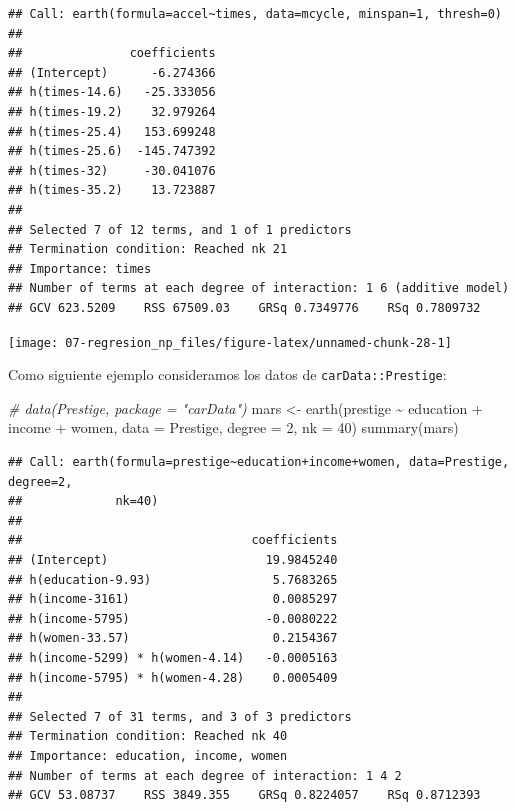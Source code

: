 \documentclass[
]{book}
\newenvironment{Shaded}{\begin{snugshade}}{\end{snugshade}}
\newcommand{\AttributeTok}[1]{\textcolor[rgb]{0.77,0.63,0.00}{#1}}
\newcommand{\CommentTok}[1]{\textcolor[rgb]{0.56,0.35,0.01}{\textit{#1}}}
\newcommand{\DecValTok}[1]{\textcolor[rgb]{0.00,0.00,0.81}{#1}}
\newcommand{\FunctionTok}[1]{\textcolor[rgb]{0.00,0.00,0.00}{#1}}
\newcommand{\NormalTok}[1]{#1}
\newcommand{\OtherTok}[1]{\textcolor[rgb]{0.56,0.35,0.01}{#1}}
\newcommand{\SpecialCharTok}[1]{\textcolor[rgb]{0.00,0.00,0.00}{#1}}
\newcommand{\StringTok}[1]{\textcolor[rgb]{0.31,0.60,0.02}{#1}}
\theoremstyle{break}
\theoremstyle{definition}
\theoremstyle{definition}
\theoremstyle{definition}
\theoremstyle{definition}
\theoremstyle{remark}
\begin{document}
\begin{verbatim}
## Call: earth(formula=accel~times, data=mcycle, minspan=1, thresh=0)
## 
##               coefficients
## (Intercept)      -6.274366
## h(times-14.6)   -25.333056
## h(times-19.2)    32.979264
## h(times-25.4)   153.699248
## h(times-25.6)  -145.747392
## h(times-32)     -30.041076
## h(times-35.2)    13.723887
## 
## Selected 7 of 12 terms, and 1 of 1 predictors
## Termination condition: Reached nk 21
## Importance: times
## Number of terms at each degree of interaction: 1 6 (additive model)
## GCV 623.5209    RSS 67509.03    GRSq 0.7349776    RSq 0.7809732
\end{verbatim}

\begin{Shaded}
\end{Shaded}

\begin{center}\texttt{[image: 07-regresion\_np\_files/figure-latex/unnamed-chunk-28-1]} \end{center}

Como siguiente ejemplo consideramos los datos de \texttt{carData::Prestige}:

\begin{Shaded}
\begin{Highlighting}[]
\CommentTok{\# data(Prestige, package = "carData")}
\NormalTok{mars }\OtherTok{\textless{}{-}} \FunctionTok{earth}\NormalTok{(prestige }\SpecialCharTok{\textasciitilde{}}\NormalTok{ education }\SpecialCharTok{+}\NormalTok{ income }\SpecialCharTok{+}\NormalTok{ women, }\AttributeTok{data =}\NormalTok{ Prestige,}
              \AttributeTok{degree =} \DecValTok{2}\NormalTok{, }\AttributeTok{nk =} \DecValTok{40}\NormalTok{)}
\FunctionTok{summary}\NormalTok{(mars)}
\end{Highlighting}
\end{Shaded}

\begin{verbatim}
## Call: earth(formula=prestige~education+income+women, data=Prestige, degree=2,
##             nk=40)
## 
##                                coefficients
## (Intercept)                      19.9845240
## h(education-9.93)                 5.7683265
## h(income-3161)                    0.0085297
## h(income-5795)                   -0.0080222
## h(women-33.57)                    0.2154367
## h(income-5299) * h(women-4.14)   -0.0005163
## h(income-5795) * h(women-4.28)    0.0005409
## 
## Selected 7 of 31 terms, and 3 of 3 predictors
## Termination condition: Reached nk 40
## Importance: education, income, women
## Number of terms at each degree of interaction: 1 4 2
## GCV 53.08737    RSS 3849.355    GRSq 0.8224057    RSq 0.8712393
\end{verbatim}
\end{document}
